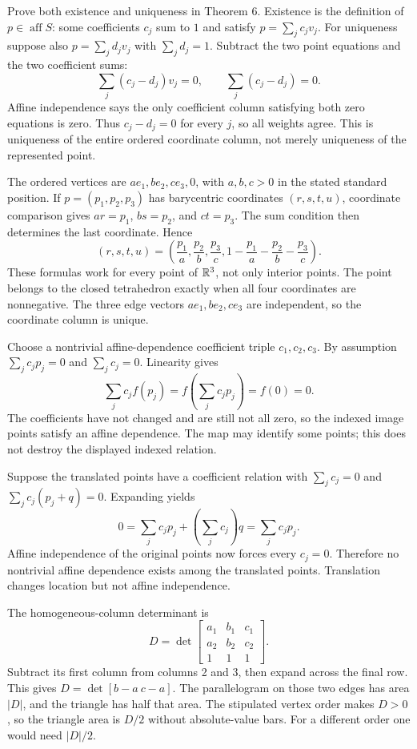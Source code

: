 \goal Prove both existence and uniqueness in Theorem 6.
Existence is the definition of $p\in\operatorname{aff}S$: some coefficients $c_j$ sum to $1$ and satisfy $p=\sum_jc_jv_j$.
For uniqueness suppose also $p=\sum_jd_jv_j$ with $\sum_jd_j=1$. Subtract the two point equations and the two coefficient sums:
\[
\sum_j(c_j-d_j)v_j=0,\qquad\sum_j(c_j-d_j)=0.
\]
Affine independence says the only coefficient column satisfying both zero equations is zero. Thus $c_j-d_j=0$ for every $j$, so all weights agree. This is uniqueness of the entire ordered coordinate column, not merely uniqueness of the represented point.

The ordered vertices are $ae_1,be_2,ce_3,0$, with $a,b,c>0$ in the stated standard position. If $p=(p_1,p_2,p_3)$ has barycentric coordinates $(r,s,t,u)$, coordinate comparison gives $ar=p_1$, $bs=p_2$, and $ct=p_3$. The sum condition then determines the last coordinate. Hence
\[
(r,s,t,u)=\left(\frac{p_1}{a},\frac{p_2}{b},\frac{p_3}{c},
1-\frac{p_1}{a}-\frac{p_2}{b}-\frac{p_3}{c}\right).
\]
These formulas work for every point of $\mathbb{R}^3$, not only interior points. The point belongs to the closed tetrahedron exactly when all four coordinates are nonnegative. The three edge vectors $ae_1,be_2,ce_3$ are independent, so the coordinate column is unique.

Choose a nontrivial affine-dependence coefficient triple $c_1,c_2,c_3$. By assumption $\sum_jc_jp_j=0$ and $\sum_jc_j=0$. Linearity gives
\[
\sum_jc_jf(p_j)=f\left(\sum_jc_jp_j\right)=f(0)=0.
\]
The coefficients have not changed and are still not all zero, so the indexed image points satisfy an affine dependence. The map may identify some points; this does not destroy the displayed indexed relation.

Suppose the translated points have a coefficient relation with $\sum_jc_j=0$ and $\sum_jc_j(p_j+q)=0$. Expanding yields
\[
0=\sum_jc_jp_j+\left(\sum_jc_j\right)q=\sum_jc_jp_j.
\]
Affine independence of the original points now forces every $c_j=0$. Therefore no nontrivial affine dependence exists among the translated points. Translation changes location but not affine independence.

The homogeneous-column determinant is
\[
D=\det\begin{bmatrix}a_1&b_1&c_1\\a_2&b_2&c_2\\1&1&1\end{bmatrix}.
\]
Subtract its first column from columns 2 and 3, then expand across the final row. This gives $D=\det[b-a\ c-a]$. The parallelogram on those two edges has area $|D|$, and the triangle has half that area. The stipulated vertex order makes $D>0$, so the triangle area is $D/2$ without absolute-value bars. For a different order one would need $|D|/2$.

